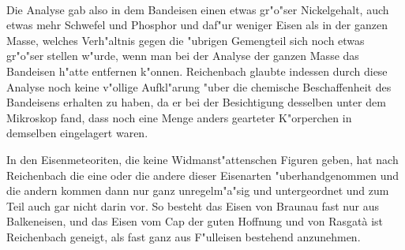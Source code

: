 \documentclass[a4paper, 11pt, oneside]{article}
\begin{document}
\paragraph{}
Die Analyse gab also in dem Bandeisen einen etwas gr"o"ser Nickelgehalt, auch etwas mehr Schwefel und Phosphor und daf"ur weniger Eisen als in der ganzen Masse, welches Verh"altnis gegen die "ubrigen Gemengteil sich noch etwas gr"o"ser stellen w"urde, wenn man bei der Analyse der ganzen Masse das Bandeisen h"atte entfernen k"onnen. Reichenbach glaubte indessen durch diese Analyse noch keine v"ollige Aufkl"arung "uber die chemische Beschaffenheit des Bandeisens erhalten zu haben, da er bei der Besichtigung desselben unter dem Mikroskop fand, dass noch eine Menge anders gearteter K"orperchen in demselben eingelagert waren.

In den Eisenmeteoriten, die keine Widmanst"attenschen Figuren geben, hat nach Reichenbach die eine oder die andere dieser Eisenarten "uberhandgenommen und die andern kommen dann nur ganz unregelm"a"sig und untergeordnet und zum Teil auch gar nicht darin vor. So besteht das Eisen von Braunau fast nur aus Balkeneisen, und das Eisen vom Cap der guten Hoffnung und von Rasgatà ist Reichenbach geneigt, als fast ganz aus F"ulleisen bestehend anzunehmen.
\end{document}
